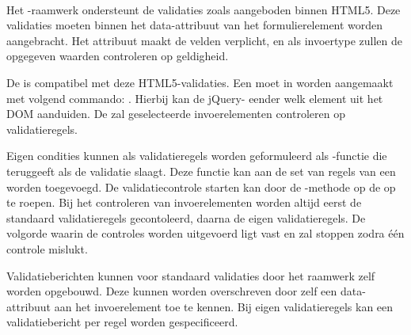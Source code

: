 \paragraph{\kendo}
Het \kendo{}-raamwerk ondersteunt de validaties zoals aangeboden binnen HTML5.
Deze validaties moeten binnen het data-attribuut van het formulierelement worden aangebracht.
Het  attribuut maakt de velden verplicht,  en  als invoertype zullen de opgegeven waarden controleren op geldigheid.

De \kendo{}  is compatibel met deze HTML5-validaties.
Een  moet in \js{} worden aangemaakt met volgend commando:  \newline
{}.
Hierbij kan de jQuery- eender welk element uit het DOM aanduiden.
De  zal geselecteerde invoerelementen controleren op validatieregels.

Eigen condities kunnen als validatieregels worden geformuleerd als \js-functie die  teruggeeft als de validatie slaagt.
Deze functie kan aan de set van regels van een  worden toegevoegd.
De validatiecontrole starten kan door de -methode op de  op te roepen.
Bij het controleren van invoerelementen worden altijd eerst de standaard validatieregels gecontoleerd,  daarna de eigen validatieregels.
De volgorde waarin de controles worden uitgevoerd ligt vast en zal stoppen zodra één controle mislukt.

Validatieberichten kunnen voor standaard validaties door het raamwerk zelf worden opgebouwd.
Deze kunnen worden overschreven door zelf een data-attribuut  aan het invoerelement toe te kennen.
Bij eigen validatieregels kan een validatiebericht per regel worden gespecificeerd.


